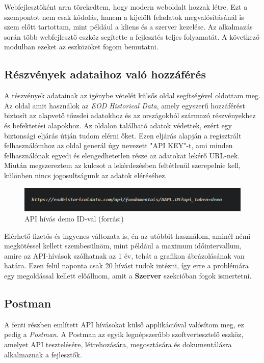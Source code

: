 Webfejlesztőként arra törekedtem, hogy modern weboldalt hozzak létre. Ezt a szempontot nem csak kódolás, hanem a kijelölt feladatok megvalósításánál is szem előtt tartottam, mint például a kliens és a szerver kezelése. Az alkalmazás során több webfejlesztő eszköz segítette a fejlesztés teljes folyamatát. A következő modulban ezeket az eszközöket fogom bemutatni.

\subsection{Részvények adataihoz való hozzáférés}

A részvények adatainak az igénybe vételét külsős oldal segítségével oldottam meg. Az oldal amit használok az \emph{EOD Historical Data}, amely egyszerű hozzáférést biztosít az alapvető tőzsdei adatokhoz és az országokból származó részvényekhez és befektetési alapokhoz. Az oldalon található adatok védettek, ezért egy biztonsági eljárás útján tudom elérni őket. Ezen eljárás alapján a regisztrált felhasználómhoz az oldal generál úgy nevezett "API KEY"-t, ami minden felhasználónak egyedi és elengedhetetlen része az adatokat lekérő URL-nek. Miután megszereztem az kulcsot a lekérdezésben feltétlenül szerepelnie kell, különben nincs jogosultságunk az adatok eléréséhez.  \cite{eod} \\

\begin{figure}[h]
\centering
\includegraphics[scale=0.9]{images/demoAPI.png}
\caption{API hívás demo ID-val (forrás:\cite{eod})}
\end{figure}

	Elérhető fizetős és ingyenes változata is, én az utóbbit használom, aminél némi megkötéssel kellett szembesülnöm, mint például a maximum időintervallum, amire az API-hívások szólhatnak az 1 év, tehát a grafikon ábrázolásának van határa. Ezen felül naponta csak 20 hívást tudok intézni, így erre a problémára egy megoldással kellett előállnom, amit a \textbf{Szerver} szekcióban fogok ismertetni.

\subsection{Postman}

A fenti részben említett API hívásokat külső applikációval valósítom meg, ez pedig a \emph{Postman}. A Postman az egyik legnépszerűbb szoftvertesztelő eszköz, amelyet API tesztelésére, létrehozására, megosztására és dokumentálásra alkalmaznak a fejlesztők. 

